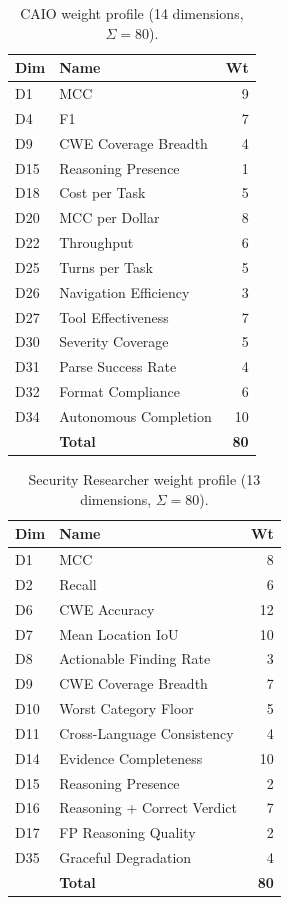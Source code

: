 \documentclass[10pt,twocolumn]{article}
\begin{document}
\begin{table}[t]
\centering
\caption{CAIO weight profile (14 dimensions, $\Sigma = 80$).}
\label{tab:caio_profile}
\small
\begin{tabular}{@{}l l r@{}}
\toprule
\textbf{Dim} & \textbf{Name} & \textbf{Wt} \\
\midrule
D1  & MCC                        & 9 \\
D4  & F1                         & 7 \\
D9  & CWE Coverage Breadth       & 4 \\
D15 & Reasoning Presence         & 1 \\
D18 & Cost per Task              & 5 \\
D20 & MCC per Dollar             & 8 \\
D22 & Throughput                 & 6 \\
D25 & Turns per Task             & 5 \\
D26 & Navigation Efficiency      & 3 \\
D27 & Tool Effectiveness         & 7 \\
D30 & Severity Coverage          & 5 \\
D31 & Parse Success Rate         & 4 \\
D32 & Format Compliance          & 6 \\
D34 & Autonomous Completion      & 10 \\
\midrule
    & \textbf{Total}             & \textbf{80} \\
\bottomrule
\end{tabular}
\end{table}

\begin{table}[t]
\centering
\caption{Security Researcher weight profile (13 dimensions, $\Sigma = 80$).}
\label{tab:researcher_profile}
\small
\begin{tabular}{@{}l l r@{}}
\toprule
\textbf{Dim} & \textbf{Name} & \textbf{Wt} \\
\midrule
D1  & MCC                        & 8 \\
D2  & Recall                     & 6 \\
D6  & CWE Accuracy               & 12 \\
D7  & Mean Location IoU          & 10 \\
D8  & Actionable Finding Rate    & 3 \\
D9  & CWE Coverage Breadth       & 7 \\
D10 & Worst Category Floor       & 5 \\
D11 & Cross-Language Consistency  & 4 \\
D14 & Evidence Completeness      & 10 \\
D15 & Reasoning Presence         & 2 \\
D16 & Reasoning + Correct Verdict & 7 \\
D17 & FP Reasoning Quality       & 2 \\
D35 & Graceful Degradation       & 4 \\
\midrule
    & \textbf{Total}             & \textbf{80} \\
\bottomrule
\end{tabular}
\end{table}
\end{document}
